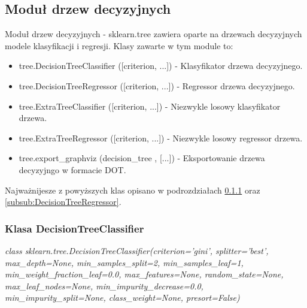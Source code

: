 \documentclass[10pt,a4paper]{article}
\begin{document}
\subsection{Moduł drzew decyzyjnych}
Moduł drzew decyzyjnych - sklearn.tree zawiera oparte na drzewach decyzyjnych modele klasyfikacji i regresji. Klasy zawarte w tym module to:
\begin{itemize}
	\item tree.DecisionTreeClassifier ([criterion, ...]) - Klasyfikator drzewa decyzyjnego.
	\item tree.DecisionTreeRegressor ([criterion, ...]) - Regressor drzewa decyzyjnego.
	\item tree.ExtraTreeClassifier ([criterion, ...]) - Niezwykle losowy klasyfikator drzewa.
	\item tree.ExtraTreeRegressor ([criterion, ...]) - Niezwykle losowy regressor drzewa.
	\item tree.export\_graphviz (decision\_tree , [...]) - Eksportowanie drzewa decyzyjngo w formacie DOT.
\end{itemize}
Najważnijesze z powyższych klas opisano w podrozdziałach \ref{subsub:DecisionTreeClassifier} oraz \ref{subsub:DecisionTreeRegressor}.

\subsubsection{Klasa DecisionTreeClassifier}
\label{subsub:DecisionTreeClassifier}
\begin{flushleft}
	\textit{class sklearn.tree.DecisionTreeClassifier(criterion=’gini’, splitter=’best’, max\_depth=None, min\_samples\_split=2, min\_samples\_leaf=1, min\_weight\_fraction\_leaf=0.0, max\_features=None, random\_state=None, max\_leaf\_nodes=None, min\_impurity\_decrease=0.0, min\_impurity\_split=None, class\_weight=None, presort=False)}
\end{flushleft}\par
\vskip 0.2in
\end{document}
